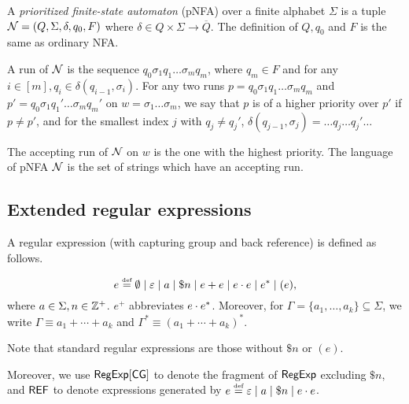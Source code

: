 \begin{definition}
  A \emph{prioritized finite-state automaton} (pNFA) over a finite alphabet $\Sigma$ is a tuple $\mathcal{N}=(Q, \Sigma, \delta, q_0, F)$ where $\delta \in Q
  \times \Sigma \rightarrow \overline{Q}$. The definition of $Q, q_0$ and $F$ is the same as ordinary NFA.
\end{definition}

A run of $\mathcal{N}$ is the sequence $q_0 \sigma_1 q_1 \ldots \sigma_m q_m$, where $q_m \in F$ and for any $i \in [m], q_i \in \delta (q_{i - 1}, \sigma_i)$. For any two runs $p = q_0 \sigma_1 q_1 \ldots \sigma_m q_m$ and $p' =
  q_0 \sigma_1 q_1' \ldots \sigma_m q_m'$ on $w = \sigma_1 \ldots \sigma_m$, we say that $p$ is of a higher priority over
  $p'$ if $p \neq p'$, and for the smallest index $j$ with $q_j \neq q_j'$,
  $\delta (q_{j - 1}, \sigma_j) = \ldots q_j \ldots q_j' \ldots$
  
  The accepting run of $\mathcal{N}$ on $w$ is the one with the highest priority. The language of pNFA $\mathcal{N}$ is the set of
  strings which have an accepting run.
  
  
  
  \subsection{Extended regular expressions}
  
  A regular expression (with capturing group and back reference) is defined as follows.
  
  \begin{definition}
  	\[e \eqdef \emptyset \mid \varepsilon \mid a \mid \$n \mid e + e \mid e \concat e \mid e^* \mid (e)  , \]
  	where $a \in \Sigma, n \in \mathbb{Z}^+$. 
  	$e^+$ abbreviates $e \cdot e^*$. Moreover, for $\Gamma = \{a_1, \ldots, a_k\}\subseteq \Sigma$, we write $\Gamma \equiv a_1 + \cdots + a_k$ and $\Gamma^\ast \equiv (a_1 + \cdots + a_k)^\ast$. 
  \end{definition}
  
  Note that standard regular expressions are those without $\$ n$ or $(e)$.
  
  Moreover, we use ${\sf RegExp}[\sf CG]$ to denote the fragment of ${\sf RegExp}$  excluding $\$ n$, and ${\sf REF}$ to denote expressions generated by $e \eqdef \varepsilon \mid a \mid \$n \mid e \concat e$.
  
